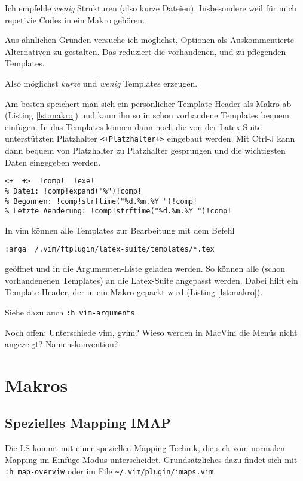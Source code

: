 \documentclass[a4paper,parskip=half,draft=true,DIV=15]{scrartcl}
\newcommand{\LS}{Latex-Suite}
\begin{document}
Ich empfehle \emph{wenig} Strukturen (also kurze Dateien). Insbesondere weil für mich repetivie Codes in ein Makro gehören.

Aus ähnlichen Gründen versuche ich möglichst, Optionen als Auskommentierte Alternativen zu gestalten.
Das reduziert die vorhandenen, und zu pflegenden Templates.

Also möglichst \emph{kurze} und \emph{wenig} Templates erzeugen.

Am besten speichert man sich ein persönlicher Template-Header als Makro ab (Listing \ref{lst:makro}) und kann ihn so in schon vorhandene Templates bequem einfügen.
In das Templates können dann noch die von der \LS{} unterstützten Platzhalter \texttt{<+Platzhalter+>} eingebaut werden.
Mit Ctrl-J kann dann bequem von Platzhalter zu Platzhalter gesprungen und die wichtigsten Daten eingegeben werden.

\begin{lstlisting}[float,caption={Template-Header, wie er als Makro verwendet werden kann.},label=lst:makro]
<+	+>	!comp!	!exe!
% Datei: !comp!expand("%")!comp!
% Begonnen: !comp!strftime("%d.%m.%Y ")!comp!
% Letzte Aenderung: !comp!strftime("%d.%m.%Y ")!comp!
\end{lstlisting}

In vim können alle Templates zur Bearbeitung mit dem Befehl

\texttt{:arga ~/.vim/ftplugin/latex-suite/templates/*.tex}

geöffnet und in die Argumenten-Liste geladen werden.
So können alle (schon vorhandenenen Templates) an die \LS{} angepasst werden.
Dabei hilft ein Template-Header, der in ein Makro gepackt wird (Listing \ref{lst:makro}).

Siehe dazu auch \texttt{:h vim-arguments}.

Noch offen: Unterschiede vim, gvim? Wieso werden in MacVim die Menüs nicht angezeigt? Namenskonvention?

\section{Makros}

\subsection{Spezielles Mapping IMAP}
Die LS kommt mit einer speziellen Mapping-Technik, die sich vom normalen Mapping im Einfüge-Modus unterscheidet.
Grundsätzliches dazu findet sich mit \texttt{:h map-overviw} oder im File \texttt{\textasciitilde/.vim/plugin/imaps.vim}. 
\end{document}
